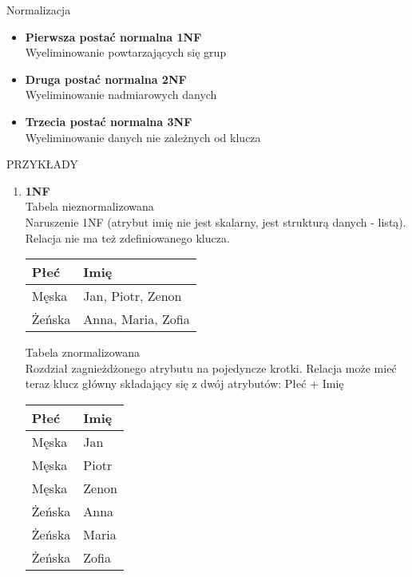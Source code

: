 \documentclass[main.tex]{subfiles}
\begin{document}
    Normalizacja
    \begin{itemize}
        \item \textbf{Pierwsza postać normalna 1NF}\\
        Wyeliminowanie powtarzających się grup
        \item \textbf{Druga postać normalna 2NF}\\
        Wyeliminowanie nadmiarowych danych
        \item \textbf{Trzecia postać normalna 3NF}\\
        Wyeliminowanie danych nie zależnych od klucza
    \end{itemize}

    PRZYKŁADY
    \begin{enumerate}
        \item \textbf{1NF}\\
        Tabela nieznormalizowana\\
        Naruszenie 1NF (atrybut imię nie jest skalarny, jest strukturą danych - listą). Relacja nie ma też zdefiniowanego klucza.

        \begin{table}[H]
            \begin{tabular}{|l|l|}
                \hline
                Płeć & Imię               \\ \hline
                Męska & Jan, Piotr, Zenon  \\ \hline
                Żeńska & Anna, Maria, Zofia \\ \hline
            \end{tabular}
        \end{table}

        Tabela znormalizowana\\
        Rozdział zagnieżdżonego atrybutu na pojedyncze krotki. Relacja może mieć teraz klucz główny składający się z dwój atrybutów: Płeć + Imię

        \begin{table}[H]
            \begin{tabular}{|l|l|}
                \hline
                Płeć & Imię  \\ \hline
                Męska & Jan   \\ \hline
                Męska & Piotr \\ \hline
                Męska & Zenon \\ \hline
                Żeńska & Anna  \\ \hline
                Żeńska & Maria \\ \hline
                Żeńska & Zofia \\ \hline
            \end{tabular}
        \end{table}


\end{enumerate}
\end{document}
